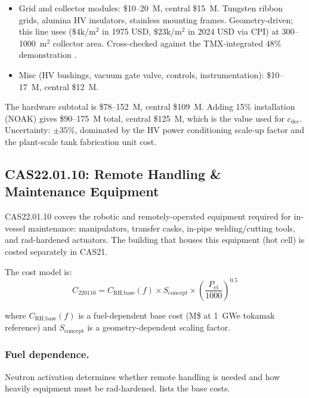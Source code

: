 \documentclass{article}
\begin{document}
\begin{itemize}
    procurement values for the ITER beam-dump components are not
    disclosed; the dollar figure here is an order-of-magnitude
    estimate scaled by area and heat flux.  ITER divertor pricing
    ($\$60$M/GW${}_\text{th}$) is overspec, since VB grids are not
    exposed to direct fusion plasma or 14~MeV neutron flux.
  \item Grid and collector modules: \$10--20~M, central \$15~M.
    Tungsten ribbon grids, alumina HV insulators, stainless
    mounting frames.  Geometry-driven; this line uses
    \citet{hoffman1977} ($\$4$k/m${}^2$ in 1975 USD, $\$23$k/m${}^2$
    in 2024 USD via CPI) at 300--1000~m${}^2$ collector area.
    Cross-checked against the TMX-integrated 48\% demonstration
    \citep{barr_moir1983}.
  \item Misc (HV bushings, vacuum gate valve, controls, instrumentation):
    \$10--17~M, central \$12~M.
\end{itemize}

The hardware subtotal is \$78--152~M, central \$109~M.  Adding 15\%
installation (NOAK) gives \$90--175~M total, central \$125~M, which
is the value used for $c_{\text{dec}}$.  Uncertainty: $\pm 35\%$,
dominated by the HV power conditioning scale-up factor and the
plant-scale tank fabrication unit cost.

\subsection{CAS22.01.10: Remote Handling \& Maintenance Equipment}
\label{sec:cas2210}

CAS22.01.10 covers the robotic and remotely-operated equipment required
for in-vessel maintenance: manipulators, transfer casks, in-pipe
welding/cutting tools, and rad-hardened actuators. The building that
houses this equipment (hot cell) is costed separately in CAS21.

The cost model is:
\begin{equation}
\label{eq:cas2210}
C_{220110} = C_{\text{RH,base}}(f) \times S_{\text{concept}}
             \times \left(\frac{P_{\text{et}}}{1000}\right)^{0.5}
\end{equation}

\noindent where $C_{\text{RH,base}}(f)$ is a fuel-dependent base cost
(M\$ at 1~GWe tokamak reference) and $S_{\text{concept}}$ is a
geometry-dependent scaling factor.

\subsubsection{Fuel dependence.}
Neutron activation determines whether remote handling is needed and how
heavily equipment must be rad-hardened.
 lists the base costs.
\end{document}
